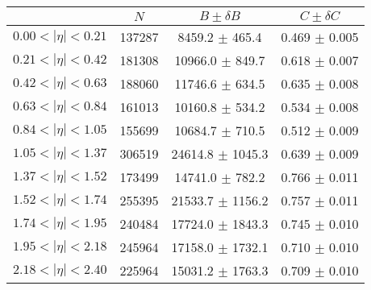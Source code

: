 \begin{tabular}{lccc}
\hline
    &   $N$   & $B \pm \delta B$  &  $C \pm \delta C$ \\
\hline
$0.00 < |\eta| <0.21$          & 137287     & 8459.2     $\pm$ 465.4 & 0.469      $\pm$ 0.005 \\
$0.21 < |\eta| <0.42$          & 181308     & 10966.0    $\pm$ 849.7 & 0.618      $\pm$ 0.007 \\
$0.42 < |\eta| <0.63$          & 188060     & 11746.6    $\pm$ 634.5 & 0.635      $\pm$ 0.008 \\
$0.63 < |\eta| <0.84$          & 161013     & 10160.8    $\pm$ 534.2 & 0.534      $\pm$ 0.008 \\
$0.84 < |\eta| <1.05$          & 155699     & 10684.7    $\pm$ 710.5 & 0.512      $\pm$ 0.009 \\
$1.05 < |\eta| <1.37$          & 306519     & 24614.8    $\pm$ 1045.3 & 0.639      $\pm$ 0.009 \\
$1.37 < |\eta| <1.52$          & 173499     & 14741.0    $\pm$ 782.2 & 0.766      $\pm$ 0.011 \\
$1.52 < |\eta| <1.74$          & 255395     & 21533.7    $\pm$ 1156.2 & 0.757      $\pm$ 0.011 \\
$1.74 < |\eta| <1.95$          & 240484     & 17724.0    $\pm$ 1843.3 & 0.745      $\pm$ 0.010 \\
$1.95 < |\eta| <2.18$          & 245964     & 17158.0    $\pm$ 1732.1 & 0.710      $\pm$ 0.010 \\
$2.18 < |\eta| <2.40$          & 225964     & 15031.2    $\pm$ 1763.3 & 0.709      $\pm$ 0.010 \\
\hline
\end{tabular}
